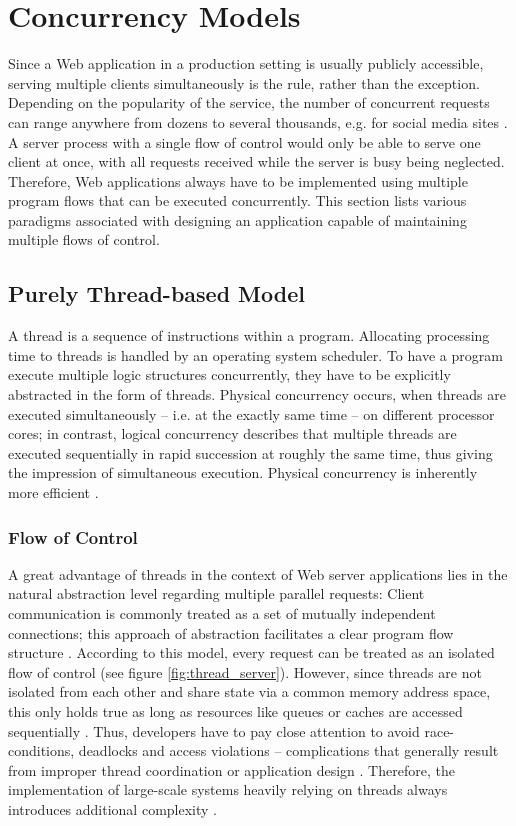 \section{Concurrency Models}
\label{sec:concurrency}

Since a Web application in a production setting is usually publicly accessible, serving multiple clients simultaneously is the rule, rather than the exception. Depending on the popularity of the service, the number of concurrent requests can range anywhere from dozens to several thousands, e.g. for social media sites \cite[p. 1]{Drolia2010}. A server process with a single flow of control would only be able to serve one client at once, with all requests received while the server is busy being neglected. Therefore, Web applications always have to be implemented using multiple program flows that can be executed concurrently. This section lists various paradigms associated with designing an application capable of maintaining multiple flows of control.

\subsection{Purely Thread-based Model}
\label{sec:threads}
A thread is a sequence of instructions within a program. Allocating processing time to threads is handled by an operating system scheduler. To have a program execute multiple logic structures concurrently, they have to be explicitly abstracted in the form of threads. Physical concurrency occurs, when threads are executed simultaneously -- i.e. at the exactly same time -- on different processor cores; in contrast, logical concurrency describes that multiple threads are executed sequentially in rapid succession at roughly the same time, thus giving the impression of simultaneous execution. Physical concurrency is inherently more efficient \cite{ThreadsJava}.

\subsubsection*{Flow of Control}
A great advantage of threads in the context of Web server applications lies in the natural abstraction level regarding multiple parallel requests: Client communication is commonly treated as a set of mutually independent connections; this approach of abstraction facilitates a clear program flow structure \cite{Veal2007}. According to this model, every request can be treated as an isolated flow of control (see figure \ref{fig:thread_server}). However, since threads are not isolated from each other and share state via a common memory address space, this only holds true as long as resources like queues or caches are accessed sequentially \cite[p. 2]{Behren2003}. Thus, developers have to pay close attention to avoid race-conditions, deadlocks and access violations -- complications that generally result from improper thread coordination or application design \cite[p. 1]{Fischer2007}. Therefore, the implementation of large-scale systems heavily relying on threads always introduces additional complexity \cite[p. 1]{Lee2006}.

